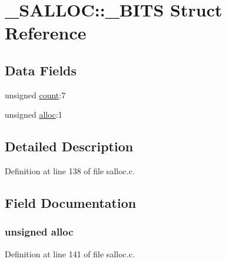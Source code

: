 \hypertarget{struct___s_a_l_l_o_c_1_1___b_i_t_s}{}\section{\+\_\+\+S\+A\+L\+L\+O\+C\+:\+:\+\_\+\+B\+I\+T\+S Struct Reference}
\label{struct___s_a_l_l_o_c_1_1___b_i_t_s}
\subsection*{Data Fields}
\begin{DoxyCompactItemize}
\item 
unsigned \hyperlink{struct___s_a_l_l_o_c_1_1___b_i_t_s_a6a9e89d63eb610dfe238b0a840979421}{count}\+:7
\item 
unsigned \hyperlink{struct___s_a_l_l_o_c_1_1___b_i_t_s_a40ab4d5daf9c5929e36c74212cb1029f}{alloc}\+:1
\end{DoxyCompactItemize}


\subsection{Detailed Description}


Definition at line 138 of file salloc.\+c.



\subsection{Field Documentation}
\hypertarget{struct___s_a_l_l_o_c_1_1___b_i_t_s_a40ab4d5daf9c5929e36c74212cb1029f}{}
\subsubsection[{alloc}]{\setlength{\rightskip}{0pt plus 5cm}unsigned alloc}\label{struct___s_a_l_l_o_c_1_1___b_i_t_s_a40ab4d5daf9c5929e36c74212cb1029f}


Definition at line 141 of file salloc.\+c.

\hypertarget{struct___s_a_l_l_o_c_1_1___b_i_t_s_a6a9e89d63eb610dfe238b0a840979421}{}
